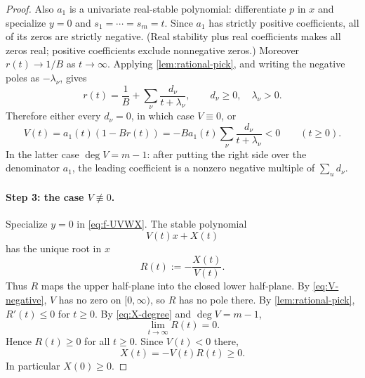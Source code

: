 \documentclass[11pt]{article}
\theoremstyle{definition}
\theoremstyle{remark}
\newcommand{\1}{\mathbf 1}
\begin{document}
\begin{proof}
Also $a_1$ is a univariate real-stable polynomial: differentiate $p$ in $x$ and
specialize $y=0$ and $s_1=\cdots=s_m=t$.  Since $a_1$ has strictly positive
coefficients, all of its zeros are strictly negative.  (Real stability plus real
coefficients makes all zeros real; positive coefficients exclude nonnegative zeros.)
Moreover $r(t)\to1/B$ as $t\to\infty$.  Applying
\cref{lem:rational-pick}, and writing the negative poles as $-\lambda_\nu$, gives
\begin{equation}\label{eq:r-expansion}
 r(t)=\frac1B+\sum_\nu\frac{d_\nu}{t+\lambda_\nu},
 \qquad d_\nu\ge0,\quad \lambda_\nu>0.
\end{equation}
Therefore either every $d_\nu=0$, in which case $V\equiv0$, or
\begin{equation}\label{eq:V-negative}
 V(t)=a_1(t)(1-Br(t))
 =-B a_1(t)\sum_\nu\frac{d_\nu}{t+\lambda_\nu}<0
 \qquad(t\ge0).
\end{equation}
In the latter case $\deg V=m-1$: after putting the right side over the denominator
$a_1$, the leading coefficient is a nonzero negative multiple of
$\sum_
u d_\nu$.

\paragraph{Step 3: the case $V\not\equiv0$.}
Specialize $y=0$ in \eqref{eq:f-UVWX}.  The stable polynomial
\begin{equation}
 V(t)x+X(t)
\end{equation}
has the unique root in $x$
\begin{equation}
 R(t):=-\frac{X(t)}{V(t)}.
\end{equation}
Thus $R$ maps the upper half-plane into the closed lower half-plane.  By
\eqref{eq:V-negative}, $V$ has no zero on $[0,\infty)$, so $R$ has no pole there.
By \cref{lem:rational-pick}, $R'(t)\le0$ for $t\ge0$.  By
\eqref{eq:X-degree} and $\deg V=m-1$,
\begin{equation}
 \lim_{t\to\infty}R(t)=0.
\end{equation}
Hence $R(t)\ge0$ for all $t\ge0$.  Since $V(t)<0$ there,
\begin{equation}
 X(t)=-V(t)R(t)\ge0.
\end{equation}
In particular $X(0)\ge0$.


\end{proof}
\end{document}
